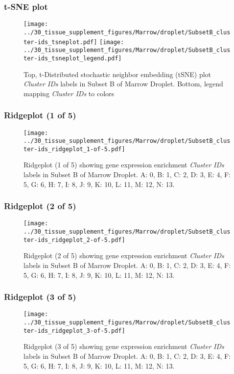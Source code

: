 \clearpage
\subsubsection{t-SNE plot}
\begin{figure}[h]
\centering
\texttt{[image: ../30\_tissue\_supplement\_figures/Marrow/droplet/SubsetB\_cluster-ids\_tsneplot.pdf]}
\texttt{[image: ../30\_tissue\_supplement\_figures/Marrow/droplet/SubsetB\_cluster-ids\_tsneplot\_legend.pdf]}
\caption{Top, t-Distributed stochastic neighbor embedding (tSNE) plot  \emph{Cluster IDs} labels in Subset B of Marrow Droplet. Bottom, legend mapping \emph{Cluster IDs} to colors}
\end{figure}


\clearpage

\subsubsection{Ridgeplot (1 of 5)}
\begin{figure}[h]
\centering
\texttt{[image: ../30\_tissue\_supplement\_figures/Marrow/droplet/SubsetB\_cluster-ids\_ridgeplot\_1-of-5.pdf]}

\caption{ Ridgeplot (1 of 5)  showing gene expression enrichment \emph{Cluster IDs} labels in Subset B of Marrow Droplet. A: 0, B: 1, C: 2, D: 3, E: 4, F: 5, G: 6, H: 7, I: 8, J: 9, K: 10, L: 11, M: 12, N: 13.}
\end{figure}


\clearpage

\subsubsection{Ridgeplot (2 of 5)}
\begin{figure}[h]
\centering
\texttt{[image: ../30\_tissue\_supplement\_figures/Marrow/droplet/SubsetB\_cluster-ids\_ridgeplot\_2-of-5.pdf]}

\caption{ Ridgeplot (2 of 5)  showing gene expression enrichment \emph{Cluster IDs} labels in Subset B of Marrow Droplet. A: 0, B: 1, C: 2, D: 3, E: 4, F: 5, G: 6, H: 7, I: 8, J: 9, K: 10, L: 11, M: 12, N: 13.}
\end{figure}


\clearpage

\subsubsection{Ridgeplot (3 of 5)}
\begin{figure}[h]
\centering
\texttt{[image: ../30\_tissue\_supplement\_figures/Marrow/droplet/SubsetB\_cluster-ids\_ridgeplot\_3-of-5.pdf]}

\caption{ Ridgeplot (3 of 5)  showing gene expression enrichment \emph{Cluster IDs} labels in Subset B of Marrow Droplet. A: 0, B: 1, C: 2, D: 3, E: 4, F: 5, G: 6, H: 7, I: 8, J: 9, K: 10, L: 11, M: 12, N: 13.}
\end{figure}


